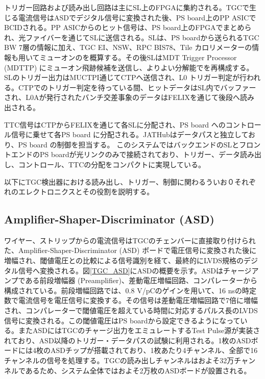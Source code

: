 トリガー回路および読み出し回路は主にSL上のFPGAに集約される。TGCで生じる電流信号はASDでデジタル信号に変換された後、PS board上のPP ASICでBCIDされる。PP ASICからのヒット信号は、PS board上のFPGAでまとめられ、光ファイバーを通じてSLに送信される。SLは、PS boardから送られるTGC BW 7層の情報に加え、TGC EI、NSW、RPC BIS78、Tile カロリメーターの情報も用いてミューオンの\pt を概算する。その後SLはMDT Trigger Processor (MDTTP) にミューオン飛跡候補を送信し、よりよい分解能で\pt を再構成する。SLのトリガー出力はMUCTPI通じてCTPへ送信され、L0 トリガー判定が行われる。CTPでのトリガー判定を待っている間、ヒットデータはSL内でバッファーされ、L0Aが発行されたバンチ交差事象のデータはFELIXを通じて後段へ読み出される。

TTC信号はCTPからFELIXを通じて各SLに分配され、PS board へのコントロール信号に乗せて各PS board に分配される。JATHubはデータパスと独立しており、PS board の制御を担当する。
このシステムではバックエンドのSLとフロントエンドのPS boardが光リンクのみで接続されており、トリガー、データ読み出し、コントロール、TTCの分配をコンパクトに実現している。

以下にTGC検出器における読み出し、トリガー、制御に関わるういお０それぞれのエレクトロニクスとその役割を説明する。

        \subsection*{Amplifier-Shaper-Discriminator (ASD)}
    ワイヤー、ストリップからの電流信号はTGCのチェンバーに直接取り付けられた、Amplifier-Shaper-Discriminator  (ASD) ボードで電圧信号に変換された後に増幅され、閾値電圧との比較による信号識別を経て、最終的にLVDS規格のデジタル信号へ変換される。図\ref{TGC_ASD}にASDの概要を示す。ASDはチャージアンプである前段増幅器 (Preamplifier)、差動電圧増幅回路、コンパレーターから構成されている。前段増幅回路では、0.8 V/pCのゲインを用いて、16 nsの時定数で電流信号を電圧信号に変換する。その信号は差動電圧増幅回路で7倍に増幅され、コンパレーターで閾値電圧を超えている時間に対応するパルス長のLVDS信号に変換される。この閾値電圧はPS boardから設定できるようになっている。またASDにはTGCのチャージ出力をエミュレートするTest Pulse源が実装されており、ASD以降のトリガー・データパスの試験に利用される。1枚のASDボードには4枚のASDチップが搭載されており、1枚あたり4チャンネル、全部で16チャンネルの信号を処理する。TGCの読み出しチャンネルはおよそ32万チャンネルであるため、システム全体ではおよそ2万枚のASDボードが設置される。

